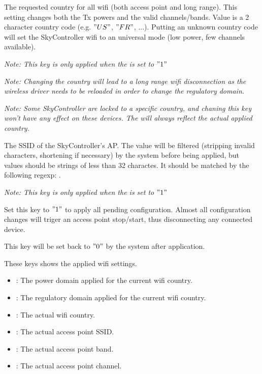 
The requested country for all wifi (both access point and long range). This setting changes both the Tx powers and the valid channels/bands. Value is a 2 character country code (e.g. $"US"$, $"FR"$, ...). Putting an unknown country code will set the SkyController wifi to an universal mode (low power, few channels available).

\emph{Note: This key is only applied when the  is set to $"1"$}

\emph{Note: Changing the country will lead to a long range wifi disconnection as the wireless driver needs to be reloaded in order to change the regulatory domain.}

\emph{Note: Some SkyController are locked to a specific country, and chaning this key won't have any effect on these devices. The  will always reflect the actual applied country.}


The SSID of the SkyController's AP. The value will be filtered (stripping invalid characters, shortening if necessary) by the system before being applied, but values should be strings of less than 32 charactes. It should be matched by the following regexp: .

\emph{Note: This key is only applied when the  is set to $"1"$}


Set this key to $"1"$ to apply all pending  configuration. Almost all configuration changes will triger an access point stop/start, thus disconnecting any connected device.

This key will be set back to $"0"$ by the system after application.


These keys shows the applied wifi settings.
\begin{itemize}
\item {} : The power domain applied for the current wifi country.
\item {} : The regulatory domain applied for the current wifi country.
\item {} : The actual wifi country.
\item {} : The actual access point SSID.
\item {} : The actual access point band.
\item {} : The actual access point channel.
\end{itemize}


